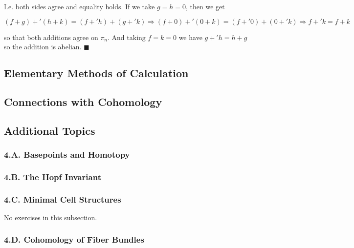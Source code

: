 \documentclass{article}
\begin{document}
I.e. both sides agree and equality holds. If we take $g = h = 0$, then we get

$$(f+g)+'(h+k) = (f+'h)+(g+'k)\Longrightarrow (f+0)+'(0+k) = (f+'0)+(0+'k)\Longrightarrow f+'k = f+k$$

so that both additions agree on $\pi_{n}$. And taking $f = k = 0$ we have $g +' h = h + g$ so the addition is abelian. $\blacksquare$
\bigskip
\bigskip

\subsection{Elementary Methods of Calculation}

\subsection{Connections with Cohomology}

\subsection*{Additional Topics}

\subsubsection*{4.A. Basepoints and Homotopy}

\subsubsection*{4.B. The Hopf Invariant}

\subsubsection*{4.C. Minimal Cell Structures}

\tab No exercises in this subsection.
\bigskip
\bigskip

\subsubsection*{4.D. Cohomology of Fiber Bundles}
\end{document}
